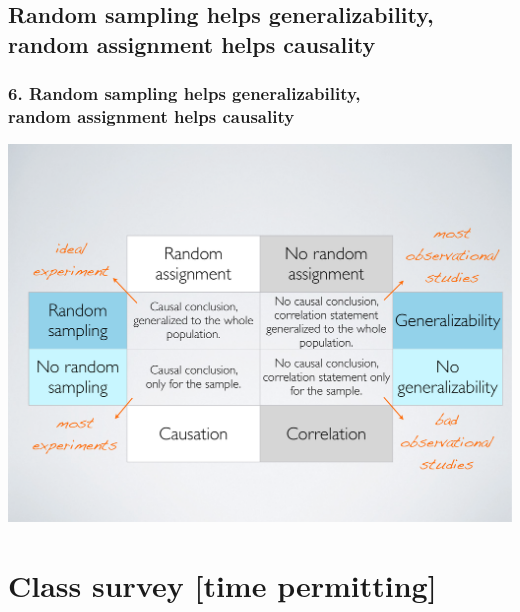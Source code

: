 \documentclass[11pt,containsverbatim,handout,xcolor=xelatex,dvipsnames,table]{beamer}
\begin{document}

\subsection{Random sampling helps generalizability, random assignment helps causality}
\label{mi6}


\begin{frame}
\frametitle{6. Random sampling helps generalizability,\\ random assignment helps 
causality}

\begin{center}
\includegraphics[width=\textwidth]{figures/random_sample_assignment}
\end{center}


\end{frame}


\section{Class survey [time permitting]}
\end{document}
